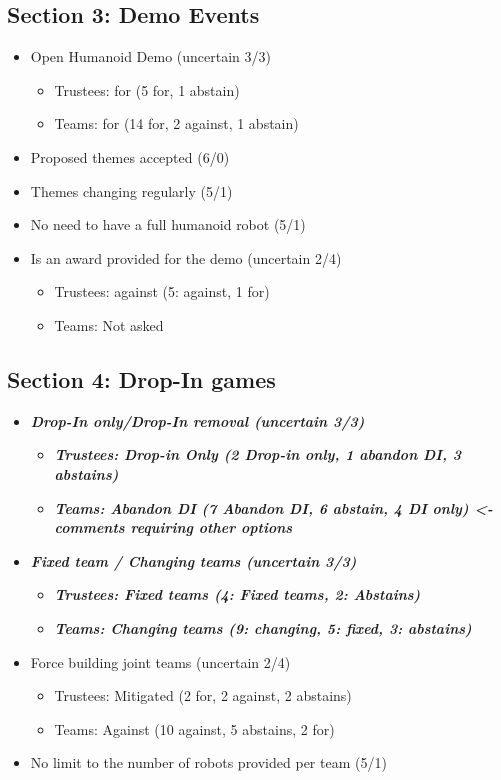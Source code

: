 \documentclass{article}
\begin{document}
\subsection{Section 3: Demo Events}

\begin{itemize} 
   \item Open Humanoid Demo (uncertain 3/3)
   \begin{itemize} 
       \item Trustees: for (5 for, 1 abstain)
       \item Teams: for (14 for, 2 against, 1 abstain)
\end{itemize}
   \item Proposed themes accepted (6/0)
   \item Themes changing regularly (5/1)
   \item No need to have a full humanoid robot (5/1)
   \item Is an award provided for the demo (uncertain 2/4)
   \begin{itemize} 
       \item Trustees: against (5: against, 1 for)
       \item Teams: Not asked
   \end{itemize}

\end{itemize}
\subsection{Section 4: Drop-In games}

\begin{itemize} 
   \item \textbf{\textit{Drop-In only/Drop-In removal (uncertain 3/3)}}
   \begin{itemize} 
       \item \textbf{\textit{Trustees: Drop-in Only (2 Drop-in only, 1 abandon DI, 3 abstains)}}
       \item \textbf{\textit{Teams: Abandon DI (7 Abandon DI, 6 abstain, 4 DI only) <- comments requiring other options}}
\end{itemize}
   \item \textbf{\textit{Fixed team / Changing teams (uncertain 3/3)}}
   \begin{itemize} 
       \item \textbf{\textit{Trustees: Fixed teams (4: Fixed teams, 2: Abstains)}}
       \item \textbf{\textit{Teams: Changing teams (9: changing, 5: fixed, 3: abstains)}}
\end{itemize}
   \item Force building joint teams (uncertain 2/4)
   \begin{itemize} 
       \item Trustees: Mitigated (2 for, 2 against, 2 abstains)
       \item Teams: Against (10 against, 5 abstains, 2 for)
\end{itemize}
   \item No limit to the number of robots provided per team (5/1)
\end{itemize}
\end{document}
